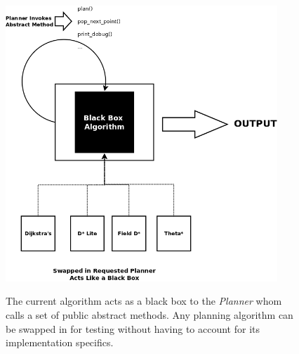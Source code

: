 \begin{figure}[htbp]

\center \includegraphics[width=290pt]{illustrations/abstraction}\\
\caption{The current algorithm acts as a black box to the \textit{Planner} whom calls a set of public abstract methods. Any planning algorithm can be swapped in for testing without having to account for its implementation specifics.} 
\label{abstraction_method}

\end{figure}


\newpage




